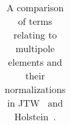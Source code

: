 \begin{table}[h!!!!t]
\begin{center}
\begin{tabular}{ | l | l | l | p{2.35in} | }
		\\  \hline
	\end{tabular}
	\end{center}
	\caption[Multipole Notation]{A comparison of terms relating to multipole elements and their normalizations in JTW~\cite{jtw,jtw_coulomb} and Holstein~\cite{holstein,holstein_errata}.}
	\label{table:compare_notation_multipoles}
\end{table}
\renewcommand{\arraystretch}{1}
%
%
%
%
